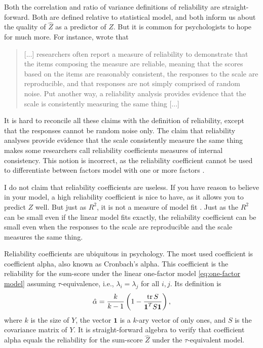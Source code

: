 Both the correlation and ratio of variance definitions of reliability are straight-forward. Both are defined relative to statistical model, and both inform us about the quality of $\hat{Z}$ as a predictor of $Z$. But it is common for psychologists to hope for much more. For instance, \textcite{McNeish2018-vu} wrote that
\begin{quote} 
[...] researchers often report a measure of reliability to demonstrate that the items composing the measure are reliable, meaning that the scores based on the items are reasonably consistent, the responses to the scale are reproducible, and that responses are not simply comprised of random noise. Put another way, a reliability analysis provides evidence that the scale is consistently measuring the same thing [...]
\end{quote}

It is hard to reconcile all these claims with the definition of reliability, except that the responses cannot be random noise only. The claim that reliability analyses provide evidence that the scale consistently measure the same thing makes some researchers call reliability coefficients measures of internal consistency. This notion is incorrect, as the reliability coefficient cannot be used to differentiate between factors model with one or more factors \parencite[]{McDonald1981-xz}.

I do not claim that reliability coefficients are useless. If you have reason to believe in your model, a high reliability coefficient is nice to have, as it allows you to predict $Z$ well. But just as $R^2$, it is not a measure of model fit \parencite{Helland1987-eb}. Just as the $R^2$ can be small even if the linear model fits exactly, the reliability coefficient can be small even when the responses to the scale are reproducible and the scale measures the same thing. 

Reliability coefficients are ubiquitous in psychology. The most used coefficient is coefficient alpha, also known as Cronbach's alpha. This coefficient is the reliability for the sum-score under the linear one-factor model \eqref{eq:one-factor model} assuming $\tau$-equivalence, i.e., $\lambda_i = \lambda_j$ for all $i,j$. Its definition is 
\begin{equation}
\hat{\alpha}=\frac{k}{k-1}\left(1-\frac{\operatorname{tr}{S}}{\boldsymbol{1}^{T}S\boldsymbol{1}}\right),\label{eq:sample coefficient alpha}
\end{equation}
where $k$ is the size of $Y$, the vector $\boldsymbol{1}$ is a $k$-ary vector of only ones, and $S$ is the covariance matrix of $Y$. It is straight-forward algebra to verify that coefficient alpha equals the reliability for the sum-score $\hat{Z}$ under the $\tau$-equivalent model.

